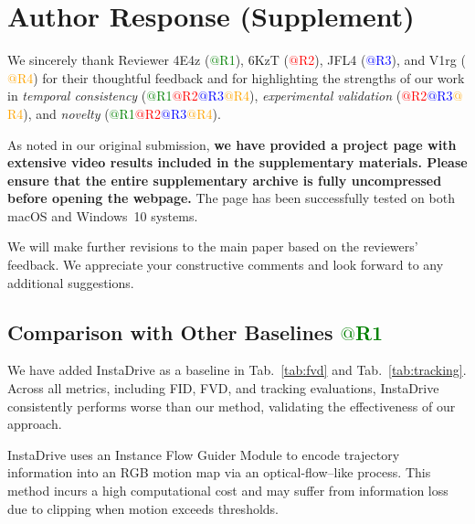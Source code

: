 \section*{Author Response {\color{red}(Supplement)}}
\label{section:author-response}

We sincerely thank Reviewer 4E4z (\textcolor{green}{$@$R1}), 6KzT (\textcolor{red}{$@$R2}), 
JFL4 (\textcolor{blue}{$@$R3}), and V1rg (\textcolor{orange}{$@$R4}) for their thoughtful feedback 
and for highlighting the strengths of our work in \textit{temporal consistency} 
(\textcolor{green}{$@$R1}\textcolor{red}{$@$R2}\textcolor{blue}{$@$R3}\textcolor{orange}{$@$R4}), 
\textit{experimental validation} (\textcolor{red}{$@$R2}\textcolor{blue}{$@$R3}\textcolor{orange}{$@$R4}), 
and \textit{novelty} (\textcolor{green}{$@$R1}\textcolor{red}{$@$R2}\textcolor{blue}{$@$R3}\textcolor{orange}{$@$R4}).

As noted in our original submission, \textbf{we have provided a project page with extensive video results included in the supplementary materials. 
Please ensure that the entire supplementary archive is fully uncompressed before opening the webpage.} 
The page has been successfully tested on both macOS and Windows~10 systems.


We will make further revisions to the main paper based on the reviewers' feedback. We appreciate your constructive comments and look forward to any additional suggestions.





\subsection{Comparison with Other Baselines \textcolor{green}{$@$R1}}

We have added InstaDrive \cite{yang25instadrive} as a baseline in Tab.~\ref{tab:fvd} and Tab.~\ref{tab:tracking}. Across all metrics, including FID, FVD, and tracking evaluations, InstaDrive consistently performs worse than our method, validating the effectiveness of our approach.

InstaDrive uses an Instance Flow Guider Module to encode trajectory information into an RGB motion map via an optical-flow–like process. This method incurs a high computational cost and may suffer from information loss due to clipping when motion exceeds thresholds. 

